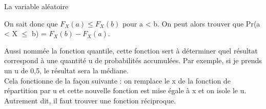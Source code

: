 \documentclass[10pt, french]{article}
\begin{document}
\begin{multicols*}{3}
\begin{probch4}{La variable aléatoire}
\begin{description}
    On sait donc que $F_{X} (a) \le F_{X} (b)$ pour a < b. On peut alors trouver que Pr(a < X $\le$ b) = $F_{X} (b) - F_{X} (a)$.
    \item[Fonction de répartition inverse ($F^{-1}_{X} (u)$):] Aussi nommée la fonction quantile, cette fonction sert à déterminer quel résultat correspond à une quantité u de probabilités accumulées. Par exemple, si je prends un u de 0,5, le résultat sera la médiane. \\
    Cela fonctionne de la façon suivante : on remplace le x de la fonction de répartition par u et cette nouvelle fonction est mise égale à x et on isole le u. Autrement dit, il faut trouver une fonction réciproque.
  \end{description}
\end{probch4}
\end{multicols*}
\end{document}
